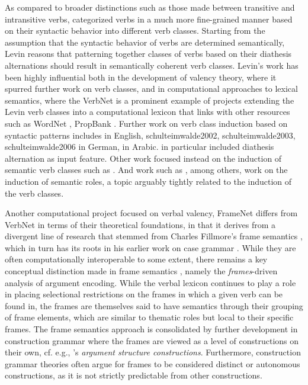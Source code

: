 As compared to broader distinctions such as those made between transitive and intransitive verbs, \citet{levin1993} categorized verbs in a much more fine-grained manner based on their syntactic behavior into different verb classes. Starting from the assumption that the syntactic behavior of verbs are determined semantically, Levin reasons that patterning together classes of verbs based on their diathesis alternations should result in semantically coherent verb classes. Levin's work has been highly influential both in the development of valency theory, where it spurred further work on verb classes, and in computational approaches to lexical semantics, where the VerbNet \citep{kipper-schuler2005, kipper2006, kipper2008} is a prominent example of projects extending the Levin verb classes into a computational lexicon that links with other resources such as WordNet \citep{fellbaum1998, miller1995}, PropBank \citep{kingsbury2002}. Further work on verb class induction based on syntactic patterns includes \citet{basili1993, navarretta2000, korhonen2006, sun2008, sun2009,sun2013} in English, {schulteimwalde2002, schulteimwalde2003, schulteimwalde2006} in German, \citet{snider2006} in Arabic. \citet{sun2013} in particular included diathesis alternation as input feature. Other work focused instead on the induction of semantic verb classes such as \citet{furstenau2012, majewska2018, majewska2020}. And work such as \citet{dowty1991, abend2009, titov2012, bickel2014, sayeed2018, watanabe2010, yamada2021}, among others, work on the induction of semantic roles, a topic arguably tightly related to the induction of the verb classes.
 
Another computational project focused on verbal valency, FrameNet \citep{baker1998, fillmore2015} differs from VerbNet in terms of their theoretical foundations, in that it derives from a divergent line of research that stemmed from Charles Fillmore's frame semantics \citep{fillmore1977, fillmore1977a, fillmore1982}, which in turn has its roots in his earlier work on case grammar \citep{fillmore1968,fillmore1970}. While they are often computationally interoperable to some extent, there remains a key conceptual distinction made in frame semantics \citet{fillmore1968}, namely the \textit{frames}-driven analysis of argument encoding. While the verbal lexicon continues to play a role in placing selectional restrictions on the frames in which a given verb can be found in, the frames are themselves said to have semantics through their grouping of frame elements, which are similar to thematic roles but local to their specific frames. The frame semantics approach is consolidated by further development in construction grammar where the frames are viewed as a level of constructions on their own, cf. e.g., \citet{goldberg1992,goldberg1995}'s \textit{argument structure constructions}. Furthermore, construction grammar theories often argue for frames to be considered distinct or autonomous constructions, as it is not strictly predictable from other constructions.

